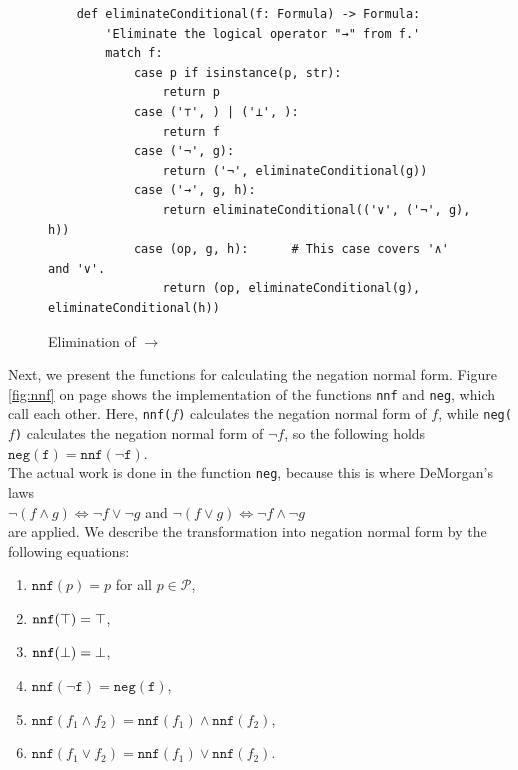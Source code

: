 \begin{figure}[!ht]
  \centering
\begin{verbatim}
    def eliminateConditional(f: Formula) -> Formula:
        'Eliminate the logical operator "→" from f.'
        match f:
            case p if isinstance(p, str): 
                return p
            case ('⊤', ) | ('⊥', ):
                return f
            case ('¬', g):
                return ('¬', eliminateConditional(g))
            case ('→', g, h): 
                return eliminateConditional(('∨', ('¬', g), h))
            case (op, g, h):      # This case covers '∧' and '∨'.
                return (op, eliminateConditional(g), eliminateConditional(h))
\end{verbatim}
\vspace*{-0.3cm}
  \caption{Elimination of $\rightarrow$}
  \label{fig:eliminate-folgt}
\end{figure}
\pagebreak
Next, we present the functions for calculating the negation normal form.
Figure
\ref{fig:nnf} on page \pageref{fig:nnf} shows the implementation of the functions
\texttt{nnf} and \texttt{neg},
which call each other.  Here, \texttt{nnf($f$)} calculates the negation normal form of $f$, while  
\texttt{neg($f$)} calculates the negation normal form of $\neg f$, so the following holds
\\[0.2cm]
\hspace*{1.3cm}
$\texttt{neg}(\texttt{f}) = \texttt{nnf}(\neg \texttt{f})$.
\\[0.2cm]
 The actual work is done in the
function \texttt{neg}, because this is where DeMorgan's laws 
\\[0.2cm]
\hspace*{1.3cm}
$\neg (f \wedge g) \Leftrightarrow \neg f \vee \neg g$ \quad and \quad 
$\neg (f \vee g) \Leftrightarrow \neg f \wedge \neg g$ 
\\[0.2cm]
are applied.  We describe the transformation into negation normal form by 
the following equations: 
\begin{enumerate}
\item $\texttt{nnf}(p) = p$ \quad for all $p \in \mathcal{P}$,
\item $\texttt{nnf}(\top) = \top$,
\item $\texttt{nnf}(\bot) = \bot$,
\item $\texttt{nnf}(\neg \texttt{f}) = \texttt{neg}(\texttt{f})$,
\item $\texttt{nnf}(f_1 \wedge f_2) = \texttt{nnf}(f_1) \wedge \texttt{nnf}(f_2)$,
\item $\texttt{nnf}(f_1 \vee f_2) = \texttt{nnf}(f_1) \vee \texttt{nnf}(f_2)$.
\end{enumerate}

